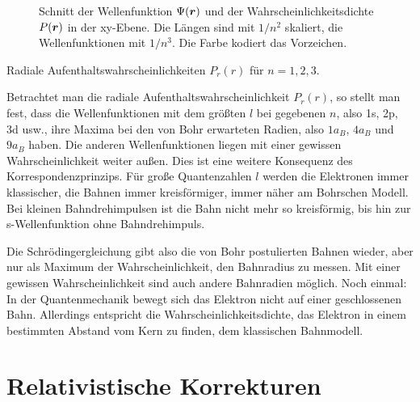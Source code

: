 \begin{figure}[tb]
    \caption{Schnitt der Wellenfunktion $\Psi(\boldsymbol{r})$ und der Wahrscheinlichkeitsdichte $P(\boldsymbol{r})$ in der xy-Ebene. Die Längen sind mit $1/n^2$ skaliert, die Wellenfunktionen mit $1/n^3$. Die Farbe kodiert das Vorzeichen.}
\end{figure}



\begin{marginfigure}
    \caption{Radiale Aufenthaltswahrscheinlichkeiten  $P_r(r)$ für $n=1,2,3$.}
\end{marginfigure}

Betrachtet man die radiale Aufenthaltswahrscheinlichkeit $P_r(r)$, so stellt man fest, dass die Wellenfunktionen mit dem größten $l$ bei gegebenen $n$, also 1s, 2p, 3d usw., ihre Maxima bei den von Bohr erwarteten Radien, also $1 a_B$, $4 a_B$ und $9 a_B$ haben. Die anderen Wellenfunktionen liegen mit einer gewissen Wahrscheinlichkeit weiter außen. Dies ist eine weitere Konsequenz des Korrespondenzprinzips. Für große Quantenzahlen $l$ werden die Elektronen immer klassischer, die Bahnen immer kreisförmiger, immer näher am Bohrschen Modell. Bei kleinen Bahndrehimpulsen ist die Bahn nicht mehr so kreisförmig, bis hin zur s-Wellenfunktion ohne Bahndrehimpuls.

Die Schrödingergleichung gibt also die von Bohr postulierten Bahnen wieder, aber nur als Maximum der Wahrscheinlichkeit, den Bahnradius zu messen. Mit einer gewissen Wahrscheinlichkeit sind auch andere Bahnradien möglich. Noch einmal: In der Quantenmechanik bewegt sich das Elektron nicht auf einer geschlossenen Bahn. Allerdings entspricht die Wahrscheinlichkeitsdichte, das Elektron in einem bestimmten Abstand vom Kern zu finden, dem klassischen Bahnmodell.



\section{Relativistische Korrekturen}



